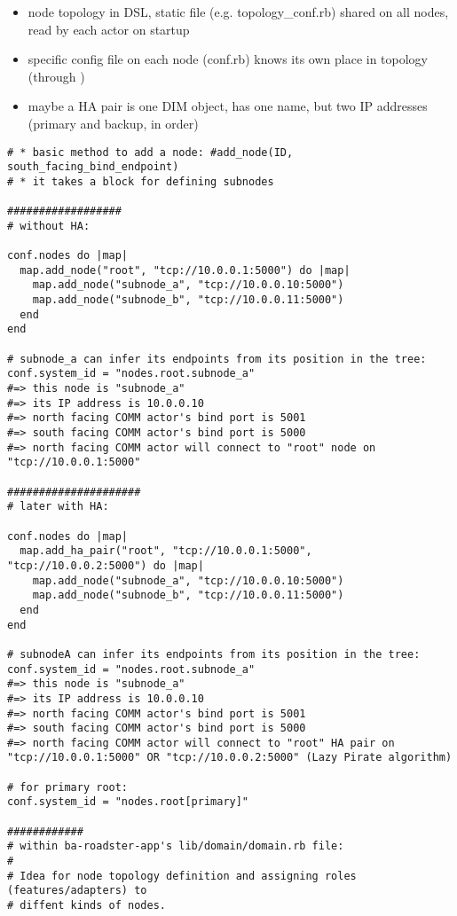 \begin{itemize}
	\item node topology in DSL, static file (e.g. topology\_conf.rb) shared on all nodes, read by each actor on startup
	\item specific config file on each node (conf.rb) knows its own place in topology (through )
	\item maybe a HA pair is one DIM object, has one name, but two IP addresses (primary and backup, in order)
\end{itemize}

\begin{lstlisting}[style=customruby]
# * basic method to add a node: #add_node(ID, south_facing_bind_endpoint)
# * it takes a block for defining subnodes

##################
# without HA:

conf.nodes do |map|
  map.add_node("root", "tcp://10.0.0.1:5000") do |map|
    map.add_node("subnode_a", "tcp://10.0.0.10:5000")
    map.add_node("subnode_b", "tcp://10.0.0.11:5000")
  end
end

# subnode_a can infer its endpoints from its position in the tree:
conf.system_id = "nodes.root.subnode_a"
#=> this node is "subnode_a"
#=> its IP address is 10.0.0.10
#=> north facing COMM actor's bind port is 5001
#=> south facing COMM actor's bind port is 5000
#=> north facing COMM actor will connect to "root" node on "tcp://10.0.0.1:5000"

#####################
# later with HA:

conf.nodes do |map|
  map.add_ha_pair("root", "tcp://10.0.0.1:5000", "tcp://10.0.0.2:5000") do |map|
    map.add_node("subnode_a", "tcp://10.0.0.10:5000")
    map.add_node("subnode_b", "tcp://10.0.0.11:5000")
  end
end

# subnodeA can infer its endpoints from its position in the tree:
conf.system_id = "nodes.root.subnode_a"
#=> this node is "subnode_a"
#=> its IP address is 10.0.0.10
#=> north facing COMM actor's bind port is 5001
#=> south facing COMM actor's bind port is 5000
#=> north facing COMM actor will connect to "root" HA pair on "tcp://10.0.0.1:5000" OR "tcp://10.0.0.2:5000" (Lazy Pirate algorithm)

# for primary root:
conf.system_id = "nodes.root[primary]"

############
# within ba-roadster-app's lib/domain/domain.rb file:
#
# Idea for node topology definition and assigning roles (features/adapters) to
# diffent kinds of nodes.


\end{lstlisting}
